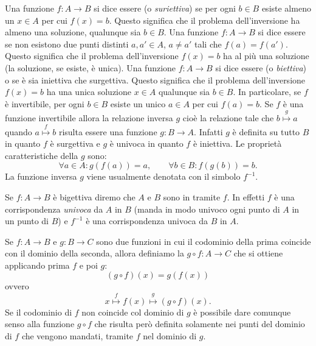 Una funzione $f\colon A \to B$ si dice essere  (o \emph{suriettiva})
se per ogni $b\in B$ esiste almeno un $x\in A$ per cui $f(x)=b$. Questo
significa che il problema dell'inversione ha almeno una soluzione, qualunque
sia $b\in B$.
Una funzione $f\colon A \to B$ si dice essere 
se non esistono due punti distinti $a,a' \in A$, $a\neq a'$ tali
che $f(a) = f(a')$. Questo significa che il problema dell'inversione
$f(x)=b$ ha al più una soluzione (la soluzione, se esiste, è unica).
Una funzione $f\colon A \to B$ si dice essere 
(o \emph{biettiva})
%
%
%
%
%
%
o
%
se è sia iniettiva che surgettiva. Questo significa
che il problema dell'inversione $f(x)=b$ ha una unica soluzione $x\in A$
qualunque sia $b\in B$. In particolare, se $f$ è invertibile, per ogni $b\in B$ esiste
un unico $a\in A$ per cui $f(a)=b$.
Se $f$ è una funzione invertibile allora la relazione inversa $g$
cioè la relazione tale che $b\stackrel g \mapsto a$ quando $a \stackrel f \mapsto b$
risulta essere una funzione $g\colon B\to A$. 
Infatti $g$ è definita su tutto $B$ in quanto $f$ è surgettiva 
e $g$ è univoca in quanto $f$ è iniettiva.
Le proprietà caratteristiche della  $g$ sono:
\begin{equation}\label{eq:572098}
  \forall a\in A\colon g(f(a)) = a, \qquad
  \forall b\in B\colon f(g(b)) = b.
\end{equation}
La funzione inversa $g$ viene usualmente denotata con il simbolo $f^{-1}$.

Se $f\colon A\to B$ è bigettiva diremo che $A$ 
e $B$ sono in  tramite $f$.
In effetti $f$ è una corrispondenza \emph{univoca} da $A$ in $B$
(manda in modo univoco ogni punto di $A$ in un punto di $B$)
e $f^{-1}$ è una corrispondenza univoca da $B$ in $A$.

Se $f\colon A \to B$ e $g\colon B \to C$ sono due funzioni in cui
il codominio della prima coincide con il dominio della seconda, allora
definiamo la  $g\circ f\colon A \to C$
che si ottiene applicando prima $f$ e poi $g$:
\[
  (g\circ f)(x) = g(f(x))
\]
ovvero 
\[
  x \stackrel f \mapsto f(x) \stackrel g \mapsto (g\circ f)(x).  
\]
Se il codominio di $f$ non coincide col dominio
di $g$ è possibile dare comunque senso alla funzione $g\circ f$
che risulta però definita solamente nei punti del dominio di
$f$ che vengono mandati, tramite $f$ nel dominio di $g$.

